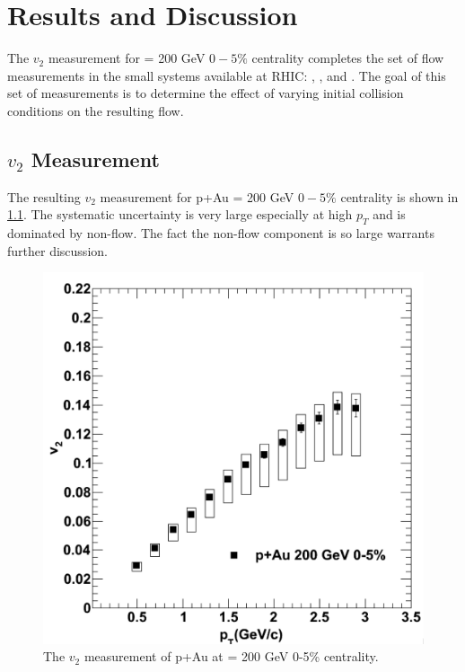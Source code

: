\chapter{Results and Discussion}
The $v_2$ measurement for \pau \sqsn = 200 GeV $0-5\%$ centrality completes the set of flow measurements in the small systems available at RHIC: \pau, \dau, and \hau. The goal of this set of measurements is to determine the effect of varying initial collision conditions on the resulting flow.
\section{$v_2$ Measurement}
The resulting $v_2$ measurement for p+Au \sqsn = 200 GeV $0-5\%$ centrality is shown in \ref{fig:pau_points_alone}.  The systematic uncertainty is very large especially at high $p_T$ and is dominated by non-flow. The fact the non-flow component is so large warrants further discussion. 

\begin{figure}[!ht]
\begin{center}
\includegraphics[width=0.65\linewidth]{figs/pau_points.png}
\caption{The $v_2$ measurement of p+Au at \sqsn =  200 GeV 0-5\% centrality.}
\label{fig:pau_points_alone}
\end{center}
\end{figure}

